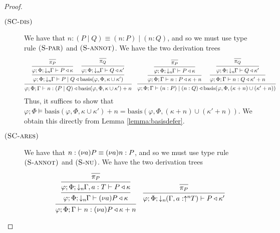 \begin{lemma}
\begin{proof}
\begin{description}
%
\item[$\mbox{\textsc{\protect{(SC-dis})}}$] We have that $n : (P \mid Q) \equiv (n : P) \mid (n : Q)$, and so we must use type rule $\mbox{\textsc{\protect{(S-par})}}$ and $\mbox{\textsc{\protect{(S-annot})}}$. We have the two derivation trees 
{\small
\begin{align*}
    \begin{prooftree}
    \Infer0{\pi_P}
    \Infer1{\varphi;\Phi;\downarrow_n\!\!\Gamma\vdash P \triangleleft \kappa}
    \Infer0{\pi_Q}
    \Infer1{\varphi;\Phi;\downarrow_n\!\!\Gamma\vdash Q \triangleleft \kappa'}
    \Infer2{\varphi;\Phi;\downarrow_n\!\!\Gamma\vdash P \mid Q \triangleleft \text{basis}(\varphi,\Phi,\kappa\cup\kappa')}
    \Infer1{\varphi;\Phi;\Gamma\vdash n : (P \mid Q) \triangleleft \text{basis}(\varphi,\Phi,\kappa\cup\kappa') + n}
    \end{prooftree}\quad
    \begin{prooftree}
    \Infer0{\pi_P}
    \Infer1{\varphi;\Phi;\downarrow_n\!\!\Gamma\vdash P \triangleleft \kappa}
    \Infer1{\varphi;\Phi;\Gamma\vdash n : P \triangleleft \kappa + n}
    \Infer0{\pi_Q}
    \Infer1{\varphi;\Phi;\downarrow_n\!\!\Gamma\vdash Q \triangleleft \kappa'}
    \Infer1{\varphi;\Phi;\Gamma\vdash n : Q \triangleleft \kappa' + n}
    \Infer2{\varphi;\Phi;\Gamma\vdash (n : P) \mid (n:Q) \triangleleft \text{basis}(\varphi,\Phi,(\kappa+n)\cup(\kappa'+n))}
    \end{prooftree}
\end{align*}}
Thus, it suffices to show that $\varphi;\Phi\vDash \text{basis}(\varphi,\Phi,\kappa\cup\kappa') + n = \text{basis}(\varphi,\Phi,(\kappa+n)\cup(\kappa'+n))$. We obtain this directly from Lemma \ref{lemma:basisdefer}.
%
\item[$\mbox{\textsc{\protect{(SC-ares})}}$] We have that $n : (\nu a) P \equiv (\nu a) n : P$, and so we must use type rule $\mbox{\textsc{\protect{(S-annot})}}$ and $\mbox{\textsc{\protect{(S-nu})}}$. We have the two derivation trees
\begin{align*}
    \begin{prooftree}
    \Infer0{\pi_P}
    \Infer1{\varphi;\Phi;\downarrow_n\!\!\Gamma,a:T\vdash P \triangleleft \kappa}
    \Infer1{\varphi;\Phi;\downarrow_n\!\!\Gamma\vdash \newvar{a}{P} \triangleleft \kappa}
    \Infer1{\varphi;\Phi;\Gamma\vdash n : \newvar{a}{P} \triangleleft \kappa + n}
    \end{prooftree}\quad
    \begin{prooftree}
    \Infer0{\pi_P}
    \Infer1{\varphi;\Phi;\downarrow_n\!\!(\Gamma,a:\uparrow^n\!\!T)\vdash P \triangleleft \kappa'}

\end{prooftree}
\end{align*}
\end{description}
\end{proof}
\end{lemma}
